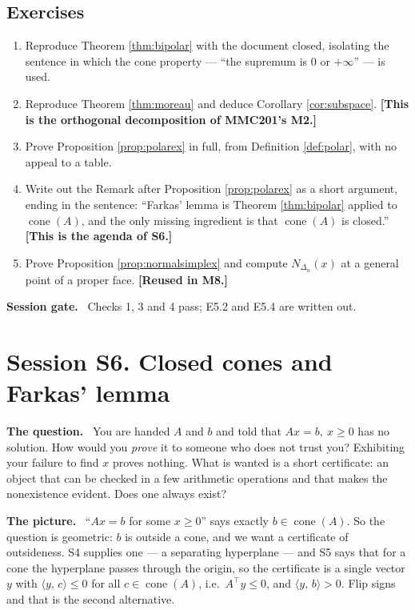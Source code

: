 \documentclass[11pt,a4paper]{article}
\newcommand{\mpart}[1]{\smallskip\noindent\textbf{#1}\ \ignorespaces}
\theoremstyle{definition}
\theoremstyle{plain}
\theoremstyle{remark}
\newcommand{\ip}[2]{\langle #1,\, #2\rangle}
\DeclareMathOperator{\cone}{cone}
\newcommand{\Simplex}{\Delta}
\newcommand{\Nc}{N}
\begin{document}
\subsection*{Exercises}
\begin{enumerate}[label=E5.\arabic*]
\item Reproduce Theorem \ref{thm:bipolar} with the document closed, isolating the sentence in
which the cone property --- ``the supremum is $0$ or $+\infty$'' --- is used.
\item Reproduce Theorem \ref{thm:moreau} and deduce Corollary \ref{cor:subspace}.
\textbf{[This is the orthogonal decomposition of MMC201's M2.]}
\item Prove Proposition \ref{prop:polarex} in full, from Definition \ref{def:polar}, with no
appeal to a table.
\item Write out the Remark after Proposition \ref{prop:polarex} as a short argument, ending in
the sentence: ``Farkas' lemma is Theorem \ref{thm:bipolar} applied to $\cone(A)$, and the only
missing ingredient is that $\cone(A)$ is closed.'' \textbf{[This is the agenda of S6.]}
\item Prove Proposition \ref{prop:normalsimplex} and compute $\Nc_{\Simplex_n}(x)$ at a general
point of a proper face. \textbf{[Reused in M8.]}
\end{enumerate}

\mpart{Session gate.} Checks 1, 3 and 4 pass; E5.2 and E5.4 are written out.

\clearpage

\section{Session S6. Closed cones and Farkas' lemma}

\mpart{The question.} You are handed $A$ and $b$ and told that $Ax=b,\ x\ge0$ has no solution.
How would you \emph{prove} it to someone who does not trust you? Exhibiting your failure to find
$x$ proves nothing. What is wanted is a short certificate: an object that can be checked in a
few arithmetic operations and that makes the nonexistence evident. Does one always exist?

\mpart{The picture.} ``$Ax=b$ for some $x\ge0$'' says exactly $b\in\cone(A)$. So the question is
geometric: $b$ is outside a cone, and we want a certificate of outsideness. S4 supplies one ---
a separating hyperplane --- and S5 says that for a cone the hyperplane passes through the origin,
so the certificate is a single vector $y$ with $\ip{y}{c}\le0$ for all $c\in\cone(A)$, i.e.\
$A^\top y\le0$, and $\ip{y}{b}>0$. Flip signs and that is the second alternative.
\end{document}
